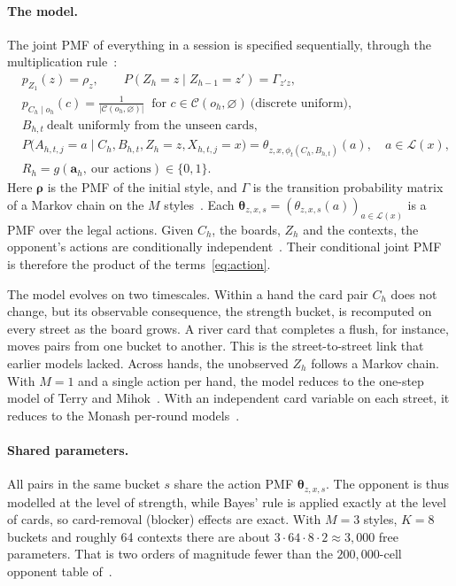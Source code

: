 \documentclass[11pt,a4paper]{article}
\newcommand{\C}{C}            %
\newcommand{\Z}{Z}            %
\newcommand{\A}{A}            %
\newcommand{\X}{X}            %
\newcommand{\B}{B}            %
\newcommand{\R}{R}            %
\newcommand{\1}{\mathbf{1}}
\newcommand{\BT}[1]{\cite[§#1]{bertsekas2000}}
\begin{document}
\paragraph{The model.} The joint PMF of everything in a session is specified
sequentially, through the multiplication rule~\BT{1.3}:
\begin{align}
  &p_{\Z_1}(z)=\rho_z,\qquad P(\Z_h=z\mid \Z_{h-1}=z')=\Gamma_{z'z},
  \label{eq:regime}\\
  &p_{\C_h\mid o_h}(c)=\frac{1}{|\mathcal{C}(o_h,\varnothing)|}\ \text{ for } c\in\mathcal{C}(o_h,\varnothing)
  \ \text{(discrete uniform)},\\
  &\B_{h,t}\ \text{dealt uniformly from the unseen cards},\\
  &P\big(\A_{h,t,j}=a\mid \C_h,\B_{h,t},\Z_h=z,\X_{h,t,j}=x\big)
     =\theta_{z,x,\phi_t(\C_h,\B_{h,t})}(a),\quad a\in\mathcal{L}(x),\label{eq:action}\\
  &\R_h = g(\mathbf{a}_h,\ \text{our actions}) \in\{0,1\}. \label{eq:reveal}
\end{align}
Here $\bm\rho$ is the PMF of the initial style, and $\Gamma$ is the transition
probability matrix of a Markov chain on the $M$ styles~\BT{6.1}. Each
$\bm\theta_{z,x,s}=(\theta_{z,x,s}(a))_{a\in\mathcal{L}(x)}$ is a PMF over the
legal actions. Given $\C_h$, the boards, $\Z_h$ and the contexts, the
opponent's actions are conditionally independent~\BT{1.5}. Their conditional
joint PMF is therefore the product of the terms~\eqref{eq:action}.

The model evolves on two timescales. Within a hand the card pair $\C_h$ does
not change, but its observable consequence, the strength bucket, is recomputed
on every street as the board grows. A river card that completes a flush, for
instance, moves pairs from one bucket to another. This is the street-to-street
link that earlier models lacked. Across hands, the unobserved $\Z_h$ follows a
Markov chain. With $M=1$ and a single action per hand, the model reduces to
the one-step model of Terry and Mihok~\cite{terry2005}. With an independent
card variable on each street, it reduces to the Monash per-round
models~\cite{korb1999}.

\paragraph{Shared parameters.} All pairs in the same bucket $s$ share the action
PMF $\bm\theta_{z,x,s}$. The opponent is thus modelled at the level of
strength, while Bayes' rule is applied exactly at the level of cards, so
card-removal (blocker) effects are exact. With $M=3$ styles, $K=8$ buckets and
roughly 64 contexts there are about $3\cdot 64\cdot 8\cdot 2\approx 3{,}000$
free parameters. That is two orders of magnitude fewer than the
$200{,}000$-cell opponent table of~\cite{nicholson2006}.
\end{document}
